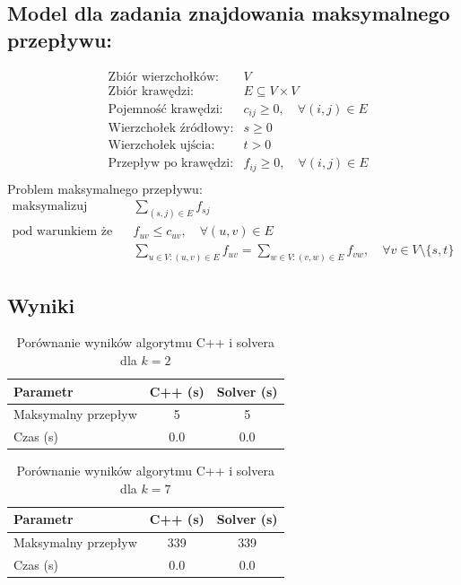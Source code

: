 \documentclass{article}
\begin{document}
\subsection*{Model dla zadania znajdowania maksymalnego przepływu:}
\begin{align*}
    & \text{Zbiór wierzchołków:} & V \\
    & \text{Zbiór krawędzi:} & E \subseteq V \times V \\
    & \text{Pojemność krawędzi:} & c_{ij} \geq 0, \quad \forall (i,j) \in E \\
    & \text{Wierzchołek źródłowy:} & s \geq 0 \\
    & \text{Wierzchołek ujścia:} & t > 0 \\
    & \text{Przepływ po krawędzi:} & f_{ij} \geq 0, \quad \forall (i,j) \in E \\
\end{align*}
Problem maksymalnego przepływu:
\begin{align*}
    \text{maksymalizuj} \quad & \sum_{(s,j) \in E} f_{sj} \\
    \text{pod warunkiem że} \quad & f_{uv} \leq c_{uv}, \quad \forall (u,v) \in E \\
    & \sum_{u \in V: (u,v) \in E} f_{uv} = \sum_{w \in V: (v,w) \in E} f_{vw}, \quad \forall v \in V \setminus \{s,t\}
\end{align*}

\subsection*{Wyniki}
\begin{table}[H]
\centering
\caption{Porównanie wyników algorytmu C++ i solvera dla $k=2$}
\begin{tabular}{lcc}
\toprule
Parametr                   & C++ (s) & Solver (s) \\
\midrule
Maksymalny przepływ       & 5      & 5       \\
Czas (s)                      & 0.0    & 0.0    \\
\bottomrule
\end{tabular}
\end{table}

\begin{table}[H]
\centering
\caption{Porównanie wyników algorytmu C++ i solvera dla $k=7$}
\begin{tabular}{lcc}
\toprule
Parametr                   & C++ (s) & Solver (s) \\
\midrule
Maksymalny przepływ       &  339     &  339   \\
Czas (s)                     & 0.0    & 0.0    \\
\bottomrule
\end{tabular}
\end{table}
\end{document}
